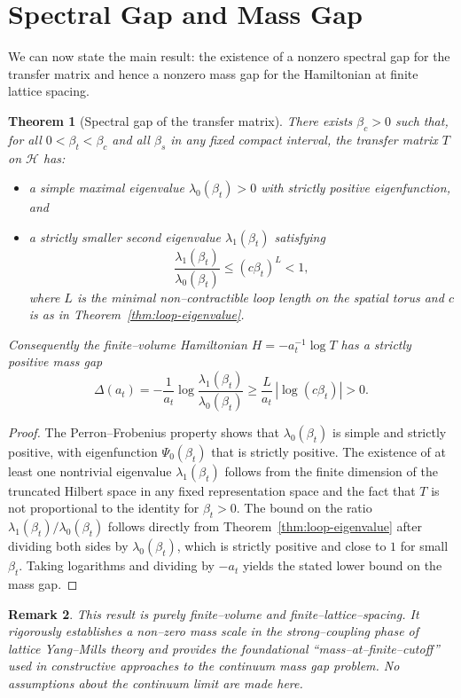 \documentclass[11pt]{article}
\newtheorem{theorem}{Theorem}[section]
\newtheorem{remark}[theorem]{Remark}
\begin{document}
\section{Spectral Gap and Mass Gap}

We can now state the main result: the existence of a nonzero spectral
gap for the transfer matrix and hence a nonzero mass gap for the
Hamiltonian at finite lattice spacing.

\begin{theorem}[Spectral gap of the transfer matrix]
\label{thm:spectral-gap}
There exists $\beta_c>0$ such that, for all $0<\beta_t<\beta_c$ and all
$\beta_s$ in any fixed compact interval, the transfer matrix $T$ on
$\mathcal{H}$ has:
\begin{itemize}
\item a simple maximal eigenvalue $\lambda_0(\beta_t)>0$ with strictly
  positive eigenfunction, and
\item a strictly smaller second eigenvalue $\lambda_1(\beta_t)$
  satisfying
  \begin{equation}
    \frac{\lambda_1(\beta_t)}{\lambda_0(\beta_t)}
    \le (c\beta_t)^L < 1,
  \end{equation}
  where $L$ is the minimal non--contractible loop length on the spatial
  torus and $c$ is as in Theorem~\ref{thm:loop-eigenvalue}.
\end{itemize}
Consequently the finite--volume Hamiltonian $H=-a_t^{-1}\log T$ has a
strictly positive mass gap
\begin{equation}
  \Delta(a_t)
  = -\frac{1}{a_t}\log\frac{\lambda_1(\beta_t)}{\lambda_0(\beta_t)}
  \ge \frac{L}{a_t}\,|\log(c\beta_t)| > 0.
\end{equation}
\end{theorem}

\begin{proof}
The Perron--Frobenius property shows that $\lambda_0(\beta_t)$ is simple
and strictly positive, with eigenfunction $\Psi_0(\beta_t)$ that is
strictly positive.  The existence of at least one nontrivial eigenvalue
$\lambda_1(\beta_t)$ follows from the finite dimension of the truncated
Hilbert space in any fixed representation space and the fact that $T$ is
not proportional to the identity for $\beta_t>0$.  The bound on the
ratio $\lambda_1(\beta_t)/\lambda_0(\beta_t)$ follows directly from
Theorem~\ref{thm:loop-eigenvalue} after dividing both sides by
$\lambda_0(\beta_t)$, which is strictly positive and close to $1$ for
small $\beta_t$.  Taking logarithms and dividing by $-a_t$ yields the
stated lower bound on the mass gap.
\end{proof}

\begin{remark}
This result is purely finite--volume and finite--lattice--spacing.  It
rigorously establishes a non--zero mass scale in the strong--coupling
phase of lattice Yang--Mills theory and provides the foundational
``mass--at--finite--cutoff'' used in constructive approaches to the
continuum mass gap problem.  No assumptions about the continuum limit
are made here.
\end{remark}
\end{document}
